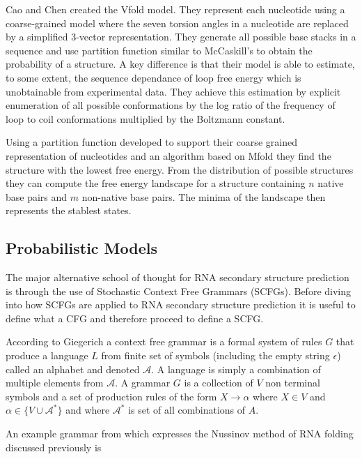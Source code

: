 \documentclass[journal]{IEEEtran}
\begin{document}
Cao and Chen \cite{cao2005predicting} created the Vfold model. They represent each nucleotide using a coarse-grained model where the seven torsion angles in a nucleotide are replaced by a simplified 3-vector representation. They generate all possible base stacks in a sequence and use partition function similar to McCaskill's to obtain the probability of a structure. A key difference is that their model is able to estimate, to some extent, the sequence dependance of loop free energy which is unobtainable from experimental data. They achieve this estimation by explicit enumeration of all possible conformations by the log ratio of the frequency of loop to coil conformations multiplied by the Boltzmann constant.

Using a partition function developed to support their coarse grained representation of nucleotides and an algorithm based on Mfold \cite{mathews1999expanded} they find the structure with the lowest free energy. From the distribution of possible structures they can compute the free energy landscape for a structure containing $n$ native base pairs and $m$ non-native base pairs. The minima of the landscape then represents the stablest states.

\subsection{Probabilistic Models}
\label{subsec:probalistic-models}
The major alternative school of thought for RNA secondary structure prediction is through the use of Stochastic Context Free Grammars (SCFGs). Before diving into how SCFGs are applied to RNA secondary structure prediction it is useful to define what a CFG and therefore proceed to define a SCFG. 

According to Giegerich\cite{giegerich2014introduction} a context free grammar is a formal system of rules $G$ that produce a language $L$ from finite set of symbols (including the empty string $\epsilon$) called an alphabet and denoted $\mathcal{A}$. A language is simply a combination of multiple elements from $\mathcal{A}$. A grammar $G$ is a collection of $V$ non terminal symbols and a set of production rules of the form $X \rightarrow \alpha$ where $X \in V$ and $\alpha \in \{V \cup \mathcal{A}^*\}$ and where $\mathcal{A}^*$ is set of all combinations of $A$.

An example grammar from \cite{rivas2013four} which expresses the Nussinov method \cite{nussinov1980fast} of RNA folding discussed previously is
\end{document}
